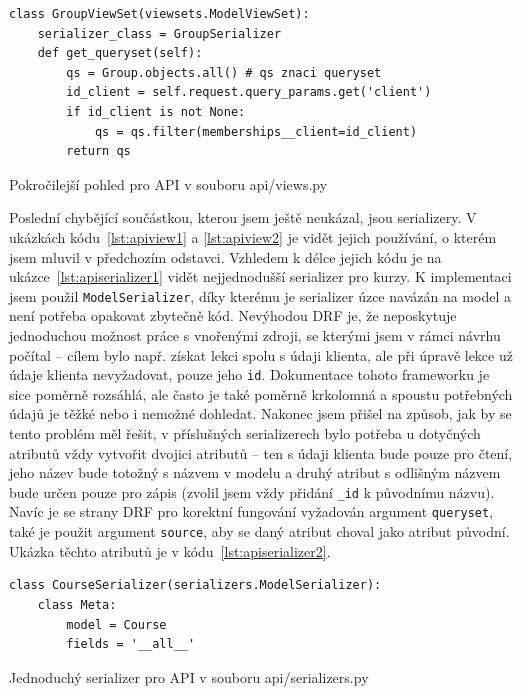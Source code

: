     \begin{listing}[ht]
    	\begin{verbatim}
class GroupViewSet(viewsets.ModelViewSet):
    serializer_class = GroupSerializer
    def get_queryset(self):
        qs = Group.objects.all() # qs znaci queryset
        id_client = self.request.query_params.get('client')
        if id_client is not None:
            qs = qs.filter(memberships__client=id_client)
        return qs
    	\end{verbatim}
    	\caption{Pokročilejší pohled pro API v souboru api/views.py}\label{lst:apiview2}
    \end{listing}
    
    Poslední chybějící součástkou, kterou jsem ještě neukázal, jsou serializery. V ukázkách kódu~\ref{lst:apiview1} a \ref{lst:apiview2} je vidět jejich používání, o kterém jsem mluvil v předchozím odstavci. Vzhledem k délce jejich kódu je na ukázce~\ref{lst:apiserializer1} vidět nejjednodušší serializer pro kurzy. K implementaci jsem použil \verb|ModelSerializer|, díky kterému je serializer úzce navázán na model a není potřeba opakovat zbytečně kód. Nevýhodou DRF je, že neposkytuje jednoduchou možnost práce s vnořenými zdroji, se kterými jsem v rámci návrhu počítal -- cílem bylo např. získat lekci spolu s údaji klienta, ale při úpravě lekce už údaje klienta nevyžadovat, pouze jeho \verb|id|. Dokumentace tohoto frameworku je sice poměrně rozsáhlá, ale často je také poměrně krkolomná a spoustu potřebných údajů je těžké nebo i nemožné dohledat. Nakonec jsem přišel na způsob, jak by se tento problém měl řešit, v příslušných serializerech bylo potřeba u dotyčných atributů vždy vytvořit dvojici atributů -- ten s údaji klienta bude pouze pro čtení, jeho název bude totožný s názvem v modelu a druhý atribut s odlišným názvem bude určen pouze pro zápis (zvolil jsem vždy přidání \verb|_id| k původnímu názvu). Navíc je se strany DRF pro korektní fungování vyžadován argument \verb|queryset|, také je použit argument \verb|source|, aby se daný atribut choval jako atribut původní. Ukázka těchto atributů je v kódu~\ref{lst:apiserializer2}. 
    
    \begin{listing}[ht]
    	\begin{verbatim}
class CourseSerializer(serializers.ModelSerializer):
    class Meta:
        model = Course
        fields = '__all__'
    	\end{verbatim}
    	\caption{Jednoduchý serializer pro API v souboru api/serializers.py}\label{lst:apiserializer1}
    \end{listing}
    
